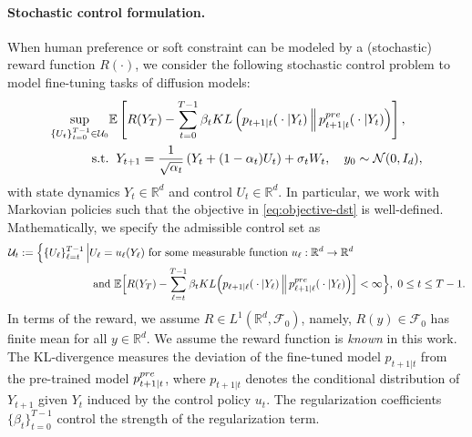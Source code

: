 \documentclass[10pt,a4paper]{amsart}
\newcommand{\curly}[1]{\left\lbrace #1 \right\rbrace}
\newcommand{\parenthesis}[1]{\left( #1 \right)}
\begin{document}
\paragraph{Stochastic control formulation.}
When human preference or soft constraint can be modeled by a (stochastic) reward function $R(\cdot)$, we consider the following  stochastic control problem to model fine-tuning tasks of diffusion models:
\begin{eqnarray}
    \sup_{\curly{U_t}_{t = 0}^{T-1}\in \mathcal{U}_0} &  \mathbb{E}\left[R(Y_T) - \sum_{t = 0}^{T-1}\beta_t{\rm KL}\parenthesis{p_{t+1\vert t} ({}\cdot{}|Y_t)\,\Big\|\,p_{t+1\vert t}^{\rm pre}({}\cdot{}|Y_t)}\right], \label{eq:objective-dst} \\ 
    \text{s.t.} & \;\; 
    Y_{t+1} = \frac{1}{\sqrt{\alpha_t}}\parenthesis{Y_t + (1 - \alpha_t)U_t} + \sigma_t W_t,\quad y_{0} \sim \mathcal{N}(0, I_{d}), \label{eq:dynamics-dst}
\end{eqnarray}
   with state dynamics $Y_t\in \mathbb{R}^d$ and control $U_t\in \mathbb{R}^d$. In particular, we work with Markovian policies such that the objective in \eqref{eq:objective-dst} is well-defined. Mathematically, we specify the admissible control set as 
   \begin{align*}
    \mathcal{U}_{t}:=\Big\{\{U_\ell\}_{\ell=t}^{T-1} \,\Big|& U_\ell = {u_\ell(Y_\ell)} \text{ for some measurable function } u_\ell: \mathbb{R}^d\rightarrow \mathbb{R}^d \\
    & \text{ and }\mathbb{E}\Big[R(Y_T) - \sum_{\ell = t}^{T-1}\beta_t{\rm KL}\Big(p_{\ell+1\vert \ell} ({}\cdot{}|Y_\ell)\,\Big\|\,p_{\ell+1\vert \ell}^{\rm pre}({}\cdot{}|Y_\ell)\Big)\Big]<\infty\Big\}, \; 0 \leq t \leq T-1.
   \end{align*}
In terms of the reward, we assume $R\in L^1(\mathbb{R}^d,\mathcal{F}_0)$, namely, $R(y)\in \mathcal{F}_0$ has finite mean for all $y\in \mathbb{R}^d$.
%
   We assume the reward function is {\it known} in this work.
   The KL-divergence measures the deviation of the fine-tuned model $p_{t+1\vert t}$ from the pre-trained model $p_{t+1\vert t}^{\rm pre}$, where $ p_{t+1 \vert t} $ denotes the conditional distribution of $ Y_{t+1} $ given $ Y_{t} $ induced by the control policy $u_t$. The regularization coefficients $\{\beta_t\}_{t=0}^{T-1}$ control the strength of the regularization term.  
\end{document}
